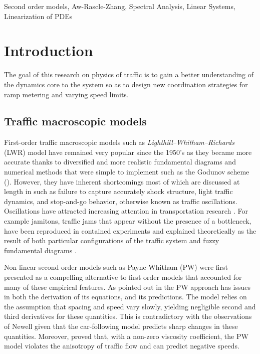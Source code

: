 \documentclass[5p,twocolumn]{elsarticle}
\begin{document}
\begin{frontmatter}
\begin{keyword}
Second order models, Aw-Rascle-Zhang, Spectral Analysis, Linear Systems, Linearization of PDEs
\end{keyword}

\end{frontmatter}


\section{Introduction}
The goal of this research on physics of traffic is to gain a better understanding of the dynamics core to the system so as to design new coordination strategies for ramp metering and varying speed limits.

\subsection{Traffic macroscopic models}
First-order traffic macroscopic models such as \textit{Lighthill--Whitham--Richards} (LWR) model \cite{LW,Richards} have remained very popular since the 1950's as they became more accurate thanks to diversified and more realistic fundamental diagrams \cite{Greenshieldsflux, Newell1993, daganzo1994cell, Wang2005141, Papageorgiou198929, Flynn09self-sustainednonlinear, treiber2013traffic, garavello2006trafficbook} and numerical methods that were simple to implement such as the Godunov scheme (\cite{godunov, Osher, daganzo1994cell,daganzo1995cell}). However, they have inherent shortcomings most of which are discussed at length in \cite{Dag_requiem} such as failure to capture accurately shock structure, light traffic dynamics, and stop-and-go behavior, otherwise known as traffic oscillations. Oscillations have attracted increasing attention in transportation research \cite{helbing2001traffic}. For example jamitons, traffic jams that appear without the presence of a bottleneck, have been reproduced in contained experiments \cite{Jamitons2008,Flynn08onjamitons} and explained theoretically as the result of both particular configurations of the traffic system \cite{Flynn09self-sustainednonlinear} and fuzzy fundamental diagrams \cite{Jamitons-multi-valued-fund}. 

Non-linear second order models such as Payne-Whitham (PW) \cite{payne1971models, whitham1974linear} were first presented as a compelling alternative to first order models that accounted for many of these empirical features.
As pointed out in \cite{Dag_requiem} the PW approach has issues in both the derivation of its equations, and its predictions. The model relies on the assumption that spacing and speed vary slowly, yielding negligible second and third derivatives for these quantities. This is contradictory with the observations of Newell \cite{Newell} given that the car-following model predicts sharp changes in these quantities. Moreover, \cite{Z} proved that, with a non-zero viscosity coefficient, the PW model violates the anisotropy of traffic flow and can predict negative speeds.
\end{document}
